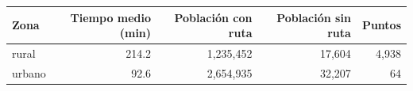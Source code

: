 \begin{tabular}{lrrrr}
\toprule
Zona & Tiempo medio (min) & Población con ruta & Población sin ruta & Puntos \\
\midrule
rural & 214.2 & 1,235,452 & 17,604 & 4,938 \\
urbano & 92.6 & 2,654,935 & 32,207 & 64 \\
\bottomrule
\end{tabular}
